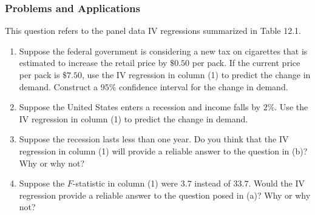 

\begin{frame}
\frametitle{Problems and Applications}
This question refers to the panel data IV regressions summarized in Table 12.1.
\begin{enumerate}
\item Suppose the federal government is considering a new tax on cigarettes that is estimated to increase the retail price by $\$0.50$ per pack. If the current price per pack is $\$7.50$, use the IV regression in column (1) to predict the change in demand. Construct a $95\%$ confidence interval for the change in demand.
\item Suppose the United States enters a recession and income falls by $2\%$. Use the IV regression in column (1) to predict the change in demand.
\item Suppose the recession lasts less than one year. Do you think that the IV regression in column (1) will provide a reliable answer to the question in (b)? Why or why not?
\item Suppose the $F$-statistic in column (1) were $3.7$ instead of $33.7$. Would the IV regression provide a reliable answer to the question posed in (a)? Why or why not?
\end{enumerate}
\end{frame}

